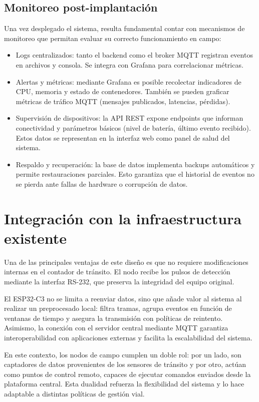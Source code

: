 \subsection{Monitoreo post-implantación}

Una vez desplegado el sistema, resulta fundamental contar con mecanismos de monitoreo que permitan evaluar su correcto funcionamiento en campo:  

\begin{itemize}
    \item Logs centralizados: tanto el backend como el broker MQTT registran eventos en archivos y consola. Se  integra con Grafana para correlacionar métricas.
    
    \item Alertas y métricas: mediante Grafana es posible recolectar indicadores de CPU, memoria y estado de contenedores. También se pueden graficar métricas de tráfico MQTT (mensajes publicados, latencias, pérdidas).
    
    \item Supervisión de dispositivos: la API REST expone endpoints que informan conectividad y parámetros básicos (nivel de batería, último evento recibido). Estos datos se representan en la interfaz web como panel de salud del sistema.
    
    \item Respaldo y recuperación: la base de datos implementa backups automáticos y permite restauraciones parciales. Esto garantiza que el historial de eventos no se pierda ante fallas de hardware o corrupción de datos.
\end{itemize}



\section{Integración con la infraestructura existente}
Una de las principales ventajas de este diseño es que no requiere modificaciones internas en el contador de tránsito. El nodo recibe los pulsos de detección mediante la interfaz RS-232, que preserva la integridad del equipo original. 

El ESP32-C3 no se limita a reenviar datos, sino que añade valor al sistema al realizar un preprocesado local: filtra tramas, agrupa eventos en función de ventanas de tiempo y asegura la transmisión con políticas de reintento. Asimismo, la conexión con el servidor central mediante MQTT garantiza interoperabilidad con aplicaciones externas y facilita la escalabilidad del sistema.

En este contexto, los nodos de campo cumplen un doble rol: por un lado, son captadores de datos provenientes de los sensores de tránsito y por otro, actúan como puntos de control remoto, capaces de ejecutar comandos enviados desde la plataforma central. Esta dualidad refuerza la flexibilidad del sistema y lo hace adaptable a distintas políticas de gestión vial.




